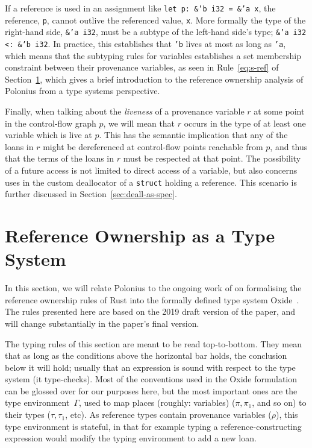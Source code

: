 \documentclass[11pt,a4paper,twoside,openany]{report}
\newcommand{\InRust}[1]{\texttt{#1}}
\begin{document}
If a reference is used in an assignment like \InRust{let p: &'b i32 = &'a x},
the reference, \InRust{p}, cannot outlive the referenced value, \InRust{x}. More
formally the type of the right-hand side, \InRust{&'a i32}, must be a subtype of
the left-hand side's type; \InRust{&'a i32 <: &'b i32}. In practice, this
establishes that \InRust{'b} lives at most as long as \InRust{'a}, which means
that the subtyping rules for variables establishes a set membership constraint
between their provenance variables, as seen in Rule~\ref{eq:s-ref} of
Section~\ref{sec:type-system}, which gives a brief introduction to the reference
ownership analysis of Polonius from a type systems perspective.

Finally, when talking about the \emph{liveness} of a provenance variable $r$ at
some point in the control-flow graph $p$, we will mean that $r$ occurs in the
type of at least one variable which is live at $p$. This has the semantic
implication that any of the loans in $r$ might be dereferenced at control-flow
points reachable from $p$, and thus that the terms of the loans in $r$ must be
respected at that point. The possibility of a future access is not limited to
direct access of a variable, but also concerns uses in the custom deallocator of
a \InRust{struct} holding a reference. This scenario is further discussed in
Section~\ref{sec:deall-as-spec}.

\section{Reference Ownership as a Type System}\label{sec:type-system}

In this section, we will relate Polonius to the ongoing work of
\citeauthor*{weiss_oxide:_2019} on formalising the reference ownership rules of
Rust into the formally defined type system Oxide~\cite{weiss_oxide:_2019}. The
rules presented here are based on the 2019 draft version of the paper, and will
change substantially in the paper's final version.

The typing rules of this section are meant to be read top-to-bottom. They mean
that as long as the conditions above the horizontal bar holds, the conclusion
below it will hold; usually that an expression is sound with respect to the type
system (it type-checks). Most of the conventions used in the Oxide formulation
can be glossed over for our purposes here, but the most important ones are the
type environment~$\Gamma$, used to map places (roughly: variables) ($\pi,
\pi_1$, and so on) to their types ($\tau, \tau_1$, etc). As reference types
contain provenance variables ($\rho$), this type environment is stateful, in
that for example typing a reference-constructing expression would modify the
typing environment to add a new loan.
\end{document}
